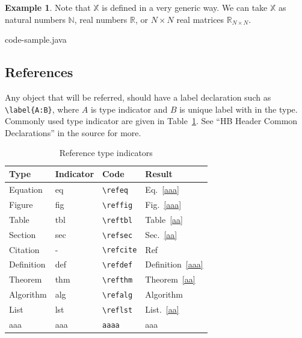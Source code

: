 \documentclass[pre,twocolumn,showkeys,longbibliography]{revtex4-1}
\newcommand{\reffig}[1]{Fig.~\ref{#1}}
\newcommand{\refeq}[1]{Eq.~\ref{#1}}
\newcommand{\reftbl}[1]{Table~\ref{#1}}
\newcommand{\refsec}[1]{Sec.~\ref{#1}}
\newcommand{\refcite}[1]{Ref~\cite{#1}}
\newcommand{\refalg}[1]{Algorithm~\cite{#1}}
\newcommand{\reflst}[1]{List.~\ref{#1}}  %
\newcommand{\refthm}[1]{Theorem~\ref{#1}}
\newcommand{\refdef}[1]{Definition~\ref{#1}}
\theoremstyle{plain}%
\theoremstyle{definition}
\newtheorem{exmp}{Example}[section]
\theoremstyle{remark}
\newcommand{\hSoX}{\mathbb{X}} %
\newcommand{\hSoN}{\mathbb{N}} %
\newcommand{\hSoR}{\mathbb{R}} %
\begin{document}
\begin{exmp}
	\label{exp:Generic}
	Note that $\hSoX$ is defined in a very generic way.
	We can take $\hSoX$ as 
	natural numbers $\hSoN$,
	real numbers $\hSoR$, or
	$N \times N$ real matrices $\hSoR_{N \times N}$.
\end{exmp}


	{code-sample.java}




\subsection{References}

Any object that will be referred,
should have a label declaration such as
\verb!\label{A:B}!,
where 
$A$ is type indicator and
$B$ is unique label with in the type.
Commonly used type indicator are given in \reftbl{tbl:TypeIndicators}.
See ``HB Header Common Declarations'' in the source for more.



\begin{table}[th]
	\caption{Reference type indicators}
	\begin{center}
	\begin{tabular}{|l |l |l |l |}
		\hline
		Type
		&Indicator
		&Code
		&Result\\
		\hline
		Equation
		&eq
		&\verb!\refeq!
		&\refeq{aaa}\\
		Figure
		&fig
		&\verb!\reffig!
		&\reffig{aaa}\\
		Table
		&tbl
		&\verb!\reftbl!
		&\reftbl{aa}\\
		Section
		&sec
		&\verb!\refsec!
		&\refsec{aa}\\
		Citation
		&-
		&\verb!\refcite!
		&\refcite{aa}\\
		Definition
		&def
		&\verb!\refdef!
		&\refdef{aaa}\\
		Theorem
		&thm
		&\verb!\refthm!
		&\refthm{aa}\\
		Algorithm
		&alg
		&\verb!\refalg!
		&\refalg{aaa}\\
		List
		&lst
		&\verb!\reflst!
		&\reflst{aa}\\
		aaa
		&aaa
		&\verb!aaaa!
		&aaa\\
		\hline
	\end{tabular}
	\end{center}
	\label{tbl:TypeIndicators}
\end{table}%
\end{document}
